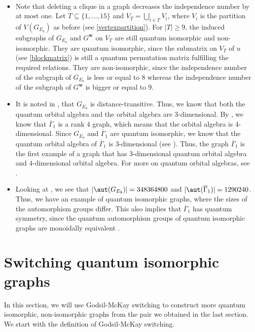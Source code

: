 \begin{rema}\label{remqiso}
\ \begin{itemize}
\item[(i)] Note that deleting a clique in a graph decreases the independence number by at most one. Let $T\subseteq \{1,\dots, 15\}$ and $V_T=\bigcup_{i\in T}V_i$, where $V_i$ is the partition of $V(G_{E_8})$ as before (see \eqref{vertexpartition}). For $|T|\geq 9$, the induced subgraphs of $G_{E_8}$ and $G^{\boldsymbol{w}}$ on $V_T$ are still quantum isomorphic and non-isomorphic. They are quantum isomorphic, since the submatrix on $V_T$ of $u$ (see \eqref{blockmatrix})  is still a quantum permutation matrix fulfilling the required relations. They are non-isomorphic, since the independence number of the subgraph of $G_{E_8}$ is less or equal to $8$ whereas the independence number of the subgraph of $G^{\boldsymbol{w}}$ is bigger or equal to $9$. 
\item[(ii)] It is noted in \cite[Section 10.39]{BVM}, that $G_{E_8}$ is distance-transitive. Thus, we know that both the quantum orbital algebra and the orbital algebra are $3$-dimensional. By \cite{BIK}, we know that $\overline{\Gamma}_1$ is a rank $4$ graph, which means that the orbital algebra is $4$-dimensional. Since $G_{E_8}$ and $\overline{\Gamma}_1$ are quantum isomorphic, we know that the quantum orbital algebra of $\overline{\Gamma}_1$ is $3$-dimensional (see \cite[Theorem 4.6]{LMR}). Thus, the graph $\overline{\Gamma}_1$ is the first example of a graph that has $3$-dimensional quantum orbital algebra and $4$-dimensional orbital algebra. For more on quantum orbital algebras, see \cite{LMR}. 
\item[(iii)] Looking at \cite[Table 2.2]{MS}, we see that $|\aut(G_{E_8})|=348364800$ and $|\aut(\overline{\Gamma}_1)|=1290240$. Thus, we have an example of quantum isomorphic graphs, where the sizes of the automorphism groups differ. This also implies that $\overline{\Gamma}_1$ has quantum symmetry, since the quantum automorphism groups of quantum isomorphic graphs are monoidally equivalent \cite[Theorem 4.7]{BCEHPSW}.
\end{itemize}
\end{rema}

\section{Switching quantum isomorphic graphs}\label{secswitching}

In this section, we will use Godsil-McKay switching to construct more quantum isomorphic, non-isomorphic graphs from the pair we obtained in the last section. We start with the definition of Godsil-McKay switching.

